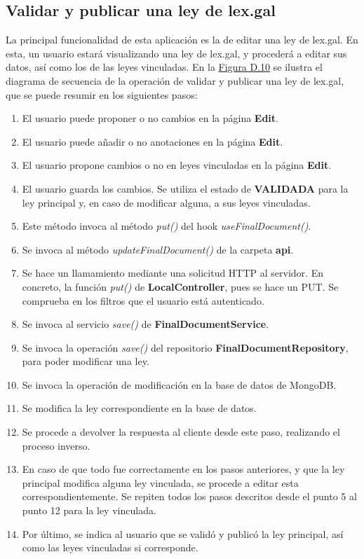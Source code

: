 \subsection{Validar y publicar una ley de lex.gal}

La principal funcionalidad de esta aplicación es la de editar una ley de lex.gal. En esta, un usuario estará visualizando una ley de lex.gal, y procederá a editar sus datos, así como los de las leyes vinculadas. En la \hyperref[enlaceDValidarLEXGAL]{Figura D.10} se ilustra el diagrama de secuencia de la operación de validar y publicar una ley de lex.gal, que se puede resumir en los siguientes pasos:

\begin{enumerate}
    \item El usuario puede proponer o no cambios en la página {\bf Edit}.
    \item El usuario puede añadir o no anotaciones en la página {\bf Edit}.
    \item El usuario propone cambios o no en leyes vinculadas en la página {\bf Edit}.
    \item El usuario guarda los cambios. Se utiliza el estado de {\bf VALIDADA} para la ley principal y, en caso de modificar alguna, a sus leyes vinculadas.
    \item Este método invoca al método {\it put()} del hook {\it useFinalDocument()}.
    \item Se invoca al método {\it updateFinalDocument()} de la carpeta  {\bf api}.
    \item Se hace un llamamiento mediante una solicitud HTTP al servidor. En concreto, la función {\it put()} de {\bf LocalController}, pues se hace un PUT. Se comprueba en los filtros que el usuario está autenticado.
    \item Se invoca al servicio {\it save()} de {\bf FinalDocumentService}.
    \item Se invoca la operación {\it save()} del repositorio {\bf FinalDocumentRepository}, para poder modificar una ley.
    \item Se invoca la operación de modificación en la base de datos de MongoDB.
    \item Se modifica la ley correspondiente en la base de datos.
    \item Se procede a devolver la respuesta al cliente desde este paso, realizando el proceso inverso.
    \item En caso de que todo fue correctamente en los pasos anteriores, y que la ley principal modifica alguna ley vinculada, se procede a editar esta correspondientemente. Se repiten todos los pasos descritos desde el punto 5 al punto 12 para la ley vinculada.
    \item Por último, se indica al usuario que se validó y publicó la ley principal, así como las leyes vinculadas si corresponde.
\end{enumerate}